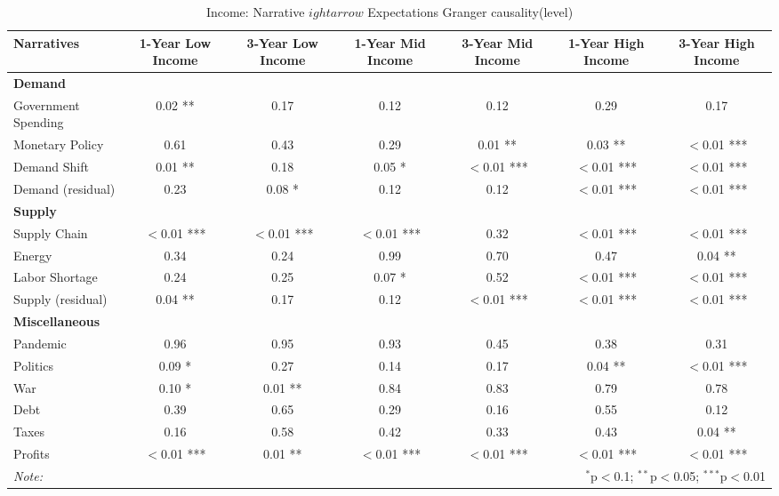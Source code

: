 \begin{sidewaystable}[ht]
\centering
\caption{Income: Narrative $
ightarrow$ Expectations Granger causality(level)}\label{table:granger}

\begin{tabular}{lcccccc}
 \toprule
\textbf{Narratives} & \textbf{1-Year Low Income} & \textbf{3-Year Low Income} & \textbf{1-Year Mid Income} & \textbf{3-Year Mid Income} & \textbf{1-Year High Income} & \textbf{3-Year High Income} \\
\midrule
\multicolumn{7}{l}{\textbf{Demand}} \\
\midrule
Government Spending & 0.02 ** & 0.17 & 0.12 & 0.12 & 0.29 & 0.17 \\
Monetary Policy & 0.61 & 0.43 & 0.29 & 0.01 ** & 0.03 ** & $<$0.01 *** \\
Demand Shift & 0.01 ** & 0.18 & 0.05 * & $<$0.01 *** & $<$0.01 *** & $<$0.01 *** \\
Demand (residual) & 0.23 & 0.08 * & 0.12 & 0.12 & $<$0.01 *** & $<$0.01 *** \\
\midrule
\multicolumn{7}{l}{\textbf{Supply}} \\
\midrule
Supply Chain & $<$0.01 *** & $<$0.01 *** & $<$0.01 *** & 0.32 & $<$0.01 *** & $<$0.01 *** \\
Energy & 0.34 & 0.24 & 0.99 & 0.70 & 0.47 & 0.04 ** \\
Labor Shortage & 0.24 & 0.25 & 0.07 * & 0.52 & $<$0.01 *** & $<$0.01 *** \\
Supply (residual) & 0.04 ** & 0.17 & 0.12 & $<$0.01 *** & $<$0.01 *** & $<$0.01 *** \\
\midrule
\multicolumn{7}{l}{\textbf{Miscellaneous}} \\
\midrule
Pandemic & 0.96 & 0.95 & 0.93 & 0.45 & 0.38 & 0.31 \\
Politics & 0.09 * & 0.27 & 0.14 & 0.17 & 0.04 ** & $<$0.01 *** \\
War & 0.10 * & 0.01 ** & 0.84 & 0.83 & 0.79 & 0.78 \\
Debt & 0.39 & 0.65 & 0.29 & 0.16 & 0.55 & 0.12 \\
Taxes & 0.16 & 0.58 & 0.42 & 0.33 & 0.43 & 0.04 ** \\
Profits & $<$0.01 *** & 0.01 ** & $<$0.01 *** & $<$0.01 *** & $<$0.01 *** & $<$0.01 *** \\
\midrule
\bottomrule
\textit{Note:}  & \multicolumn{6}{r}{$^{*}$p$<$0.1; $^{**}$p$<$0.05; $^{***}$p$<$0.01} \\
\bottomrule
\end{tabular}
\end{sidewaystable}
